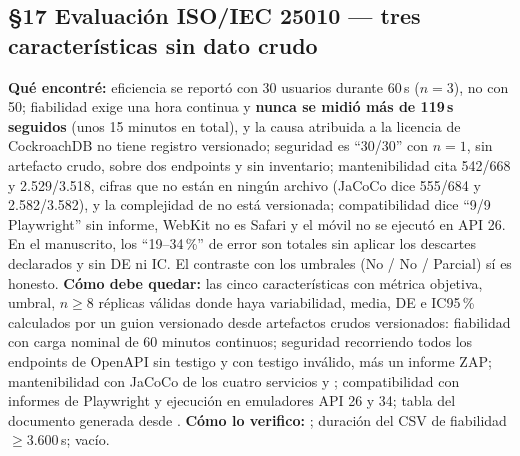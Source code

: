 \subsection*{\S17 Evaluaci\'on ISO/IEC 25010 --- tres caracter\'isticas sin dato crudo}
\textbf{Qu\'e encontr\'e:} eficiencia se report\'o con 30 usuarios durante 60\,s ($n=3$), no con 50; fiabilidad exige una hora continua y \textbf{nunca se midi\'o m\'as de 119\,s seguidos} (unos 15 minutos en total), y la causa atribuida a la licencia de CockroachDB no tiene registro versionado; seguridad es ``30/30'' con $n=1$, sin artefacto crudo, sobre dos endpoints y sin inventario; mantenibilidad cita 542/668 y 2.529/3.518, cifras que no est\'an en ning\'un archivo (JaCoCo dice 555/684 y 2.582/3.582), y la complejidad de  no est\'a versionada; compatibilidad dice ``9/9 Playwright'' sin informe, WebKit no es Safari y el m\'ovil no se ejecut\'o en API 26. En el manuscrito, los ``19--34\,\%'' de error son totales sin aplicar los descartes declarados y sin DE ni IC. El contraste con los umbrales (No / No / Parcial) s\'i es honesto. \textbf{C\'omo debe quedar:} las cinco caracter\'isticas con m\'etrica objetiva, umbral, $n \ge 8$ r\'eplicas v\'alidas donde haya variabilidad, media, DE e IC95\,\% calculados por un guion versionado desde artefactos crudos versionados: fiabilidad con carga nominal de 60 minutos continuos; seguridad recorriendo todos los endpoints de OpenAPI sin testigo y con testigo inv\'alido, m\'as un informe ZAP; mantenibilidad con JaCoCo de los cuatro servicios y ; compatibilidad con informes de Playwright y ejecuci\'on en emuladores API 26 y 34; tabla del documento generada desde . \textbf{C\'omo lo verifico:} ; duraci\'on del CSV de fiabilidad $\ge$3.600\,s;  vac\'io.


